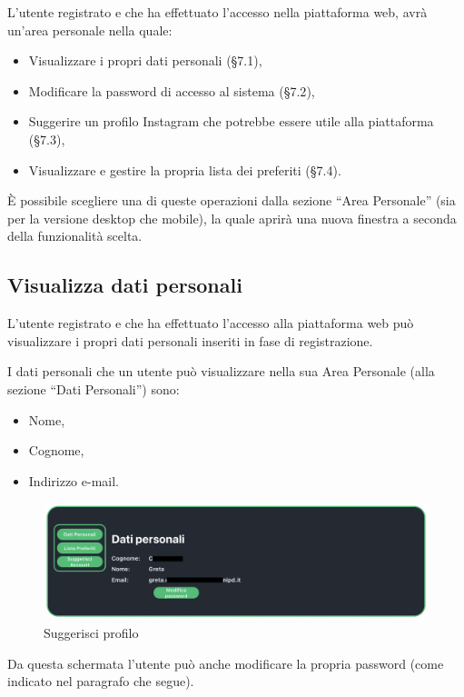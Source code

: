 L’utente registrato e che ha effettuato l’accesso nella piattaforma web, avrà un’area personale nella quale:

\begin{itemize}
\item Visualizzare i propri dati personali (\S{7.1}),
\item Modificare la password di accesso al sistema (\S{7.2}),
\item Suggerire un profilo Instagram che potrebbe essere utile alla piattaforma (\S{7.3}),
\item Visualizzare e gestire la propria lista dei preferiti (\S{7.4}).
\end{itemize}

È possibile scegliere una di queste operazioni dalla sezione “Area Personale” (sia per la versione desktop che mobile), la quale aprirà una nuova finestra a seconda della funzionalità scelta.

\subsection{Visualizza dati personali}

L’utente registrato e che ha effettuato l’accesso alla piattaforma web può visualizzare i propri dati personali inseriti in fase di registrazione.

I dati personali che un utente può visualizzare nella sua Area Personale (alla sezione “Dati Personali”) sono:

\begin{itemize}
\item Nome,
\item Cognome,
\item Indirizzo e-mail.
\end{itemize}

\begin{figure}[H]
\centering
\includegraphics[scale=0.4]{./images/AreaPersonale/DatiPersonali.png} 
\caption{Suggerisci profilo}
\end{figure}

Da questa schermata l’utente può anche modificare la propria password (come indicato nel paragrafo che segue).

